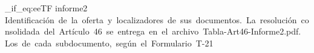 \documentclass{audit-oferta}
\begin{document}
\ExplSyntaxOn
\str_if_eq:eeTF { \instancia } { informe2 }
  {
    \FijarSubdocumento{}
    \portadaOferta
      {Identificación~de~la~oferta~y~localizadores~de~sus~documentos.~La~resolución~consolidada~del~Artículo~46~se~entrega~en~el~archivo~Tabla-Art46-Informe2.pdf.}
      {Los~de~cada~subdocumento,~según~el~Formulario~T-21}
    \hojaResumen
  }
  { \DocumentoCaratulaSobre }
\ExplSyntaxOff
\end{document}
